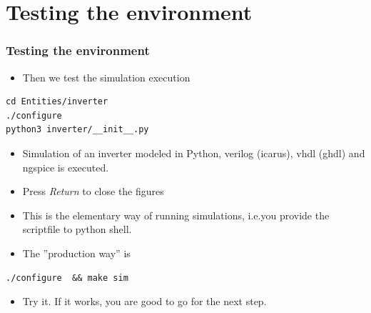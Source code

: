 \documentclass{sdkslides}
\begin{document}
\renewcommand{\sectionname}{Testing the environment}
\section*{\sectionname}
\begin{frame}[t,fragile]
    \frametitle{\sectionname} 
    \begin{itemize}
            \item Then we test the simulation execution
        \end{itemize}
\begin{lstlisting}
cd Entities/inverter     
./configure              
python3 inverter/__init__.py  
\end{lstlisting}
\begin{itemize}
    \item Simulation of an inverter modeled in Python, verilog (icarus), vhdl
        (ghdl) and ngspice is executed. 
    \item Press \emph{Return} to close the figures
    \item This is the elementary way of running simulations, i.e.you provide
        the scriptfile to python shell.
    \item The ''production way'' is 
\end{itemize}
\begin{lstlisting}
./configure  && make sim          
\end{lstlisting}
\begin{itemize}
    \item Try it. If it works, you are good to go for the next step.
\end{itemize}
\end{frame}

\renewcommand{\sectionname}{Creating a new Entity}
\end{document}
